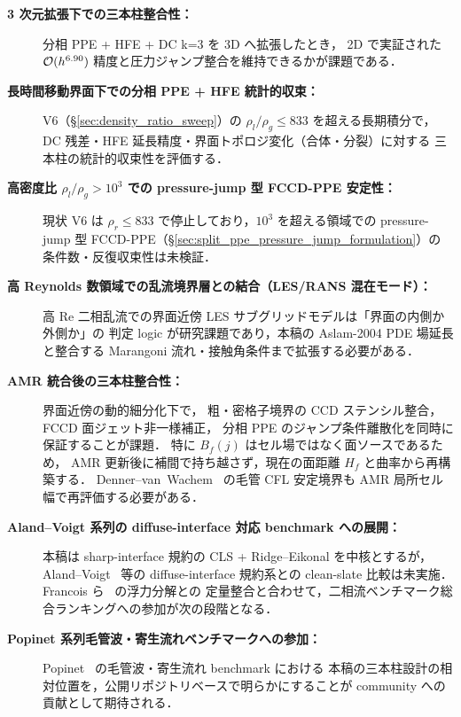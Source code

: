\begin{description}
  \item[\textbf{3 次元拡張下での三本柱整合性：}]
        分相 PPE + HFE + DC k=3 を 3D へ拡張したとき，
        2D で実証された $\mathcal{O}(h^{6.90})$ 精度と圧力ジャンプ整合を維持できるかが課題である．

  \item[\textbf{長時間移動界面下での分相 PPE + HFE 統計的収束：}]
        V6（§\ref{sec:density_ratio_sweep}）の $\rho_l/\rho_g \le 833$ を超える長期積分で，
        DC 残差・HFE 延長精度・界面トポロジ変化（合体・分裂）に対する
        三本柱の統計的収束性を評価する．

  \item[\textbf{高密度比 \texorpdfstring{$\rho_l/\rho_g > 10^3$}{rho\_l/rho\_g > 1e3} での pressure-jump 型 FCCD-PPE 安定性：}]
        現状 V6 は $\rho_r \le 833$ で停止しており，$10^3$ を超える領域での
        pressure-jump 型 FCCD-PPE（§\ref{sec:split_ppe_pressure_jump_formulation}）の
        条件数・反復収束性は未検証．

  \item[\textbf{高 Reynolds 数領域での乱流境界層との結合（LES/RANS 混在モード）：}]
        高 Re 二相乱流での界面近傍 LES サブグリッドモデルは「界面の内側か外側か」の
        判定 logic が研究課題であり，本稿の Aslam-2004 PDE 場延長と整合する
        Marangoni 流れ・接触角条件まで拡張する必要がある．

  \item[\textbf{AMR 統合後の三本柱整合性：}]
        界面近傍の動的細分化下で，
        粗・密格子境界の CCD ステンシル整合，FCCD 面ジェット非一様補正，
        分相 PPE のジャンプ条件離散化を同時に保証することが課題．
        特に $B_f(j)$ はセル場ではなく面ソースであるため，
        AMR 更新後に補間で持ち越さず，現在の面距離 $H_f$ と曲率から再構築する．
        Denner--van~Wachem~\cite{DennerVanWachem2015} の毛管 CFL 安定境界も
        AMR 局所セル幅で再評価する必要がある．

  \item[\textbf{Aland--Voigt 系列の diffuse-interface 対応 benchmark への展開：}]
        本稿は sharp-interface 規約の CLS + Ridge--Eikonal を中核とするが，
        Aland--Voigt~\cite{AlandVoigt2012} 等の diffuse-interface 規約系との
        clean-slate 比較は未実施．Francois ら~\cite{Francois2006} の浮力分解との
        定量整合と合わせて，二相流ベンチマーク総合ランキングへの参加が次の段階となる．

  \item[\textbf{Popinet 系列毛管波・寄生流れベンチマークへの参加：}]
        Popinet~\cite{Popinet2009} の毛管波・寄生流れ benchmark における
        本稿の三本柱設計の相対位置を，公開リポジトリベースで明らかにすることが
        community への貢献として期待される．
\end{description}

